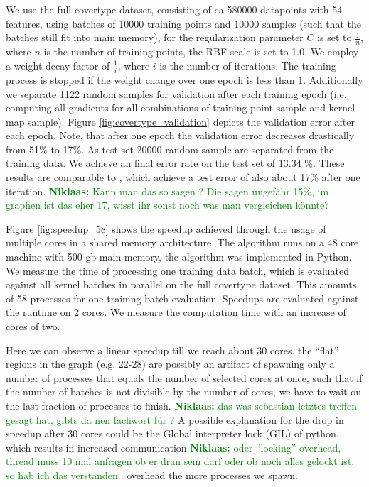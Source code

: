 \documentclass{article} %
\newcommand{\nikolaas}[1]{\textcolor{green}{{\bf Niklaas:} #1}}
\begin{document}
We use the full covertype dataset, consisting of ca 580000 datapoints with 54 features, using batches of 10000 training points and 10000 samples (such that the batches still fit into main memory), for the regularization parameter $C$ is set to $\frac{1}{n}$, where $n$ is the number of training points, the RBF scale is set to 1.0. We employ a weight decay factor of $\frac{1}{i}$, where $i$ is the number of iterations. The training process is stopped if the weight change over one epoch is less than 1.
Additionally we separate 1122 random samples for validation after each training epoch (i.e. computing all gradients for all combinations of training point sample and kernel map sample).
Figure \ref{fig:covertype_validation} depicts the validation error after each epoch.
Note, that after one epoch the validation error decreases drastically from 51\% to 17\%.
As test set 20000 random sample are separated from the training data. We achieve an final error rate on the test set of 13.34 \%. 
These results are comparable to \cite{Dai2014}, which achieve a test error of also about 17\% after one iteration. 
\nikolaas{Kann man das so sagen ? Die sagen ungefähr 15\%, im graphen ist das eher 17, wisst ihr sonst noch was man vergleichen könnte? }


Figure \ref{fig:speedup_58} shows the speedup achieved through the usage of multiple cores in a shared memory architecture.
The algorithm runs on a 48 core machine with 500 gb main memory, the algorithm was implemented in Python. We measure the time of processing one training data batch, which is evaluated against all kernel batches in parallel on the full covertype dataset. This amounts of 58 processes for one training batch evaluation. Speedups are evaluated against the runtime on 2 cores. We measure the computation time with an increase of cores of two.

Here we can observe a linear speedup till we reach about 30 cores. the ``flat'' regions in the graph (e.g. 22-28) are possibly an artifact of spawning only a number of processes that equals the number of selected cores at once, such that if the number of batches is not divisible by the number of cores, we have to wait on the last fraction of processes to finish. 
\nikolaas{das was sebastian letztes treffen gesagt hat, gibts da nen fachwort für ?}
A possible explanation for the drop in speedup after 30 cores could be the Global interpreter lock (GIL) of python, which results in increased communication 
\nikolaas{oder ``locking'' overhead, thread muss 10 mal anfragen ob er dran sein darf oder ob noch alles gelockt ist, so hab ich das verstanden..} overhead the more processes we spawn.
\end{document}
